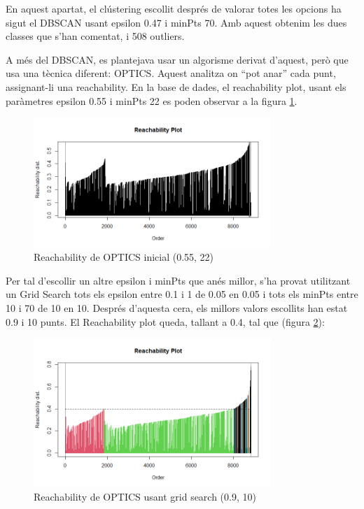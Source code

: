 \documentclass{article}
\begin{document}
En aquest apartat, el clústering escollit després de valorar totes les opcions ha sigut el DBSCAN usant epsilon 0.47 i minPts 70. Amb aquest obtenim les dues classes que s'han comentat, i 508 outliers.

A més del DBSCAN, es plantejava usar un algorisme derivat d’aquest, però que usa una tècnica diferent: OPTICS. Aquest analitza on “pot anar” cada punt, assignant-li una reachability. En la base de dades, el reachability plot, usant els paràmetres epsilon 0.55 i minPts 22 es poden observar a la figura \ref{fig:OPTICS_inicial}.

\begin{figure}[H]
    \centering
    \includegraphics[width=0.8\textwidth]{Images/4_clustering/optics/reachability1.png}
    \caption{Reachability de OPTICS inicial (0.55, 22)}
    \label{fig:OPTICS_inicial}
\end{figure}

Per tal d'escollir un altre epsilon i minPts que anés millor, s'ha provat utilitzant un Grid Search tots els epsilon entre 0.1 i 1 de 0.05 en 0.05 i tots els minPts entre 10 i 70 de 10 en 10. Després d'aquesta cera, els millors valors escollits han estat 0.9 i 10 punts. El Reachability plot queda, tallant a 0.4, tal que (figura \ref{fig:OPTICS_grid}):

\begin{figure}[H]
    \centering
    \includegraphics[width=0.8\textwidth]{Images/4_clustering/optics/reachabilitygrid.png}
    \caption{Reachability de OPTICS usant grid search (0.9, 10)}
    \label{fig:OPTICS_grid}
\end{figure}
\end{document}
